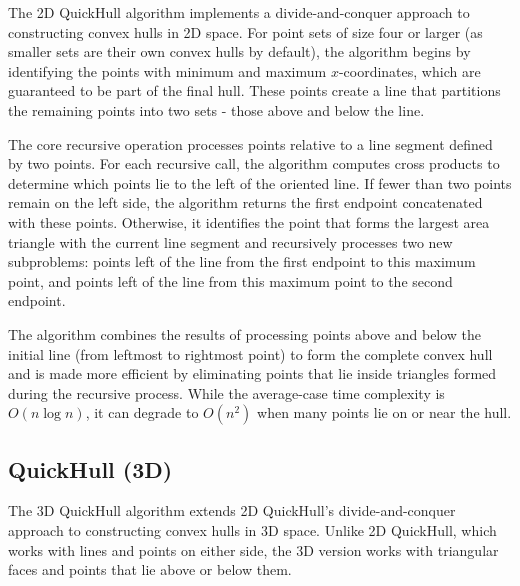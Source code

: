 \documentclass[12pt]{article}
\begin{document}
    \noindent
    The 2D QuickHull algorithm implements a divide-and-conquer approach to constructing convex hulls in 2D space. For point sets of size four or larger (as smaller sets are their own convex hulls by default), the algorithm begins by identifying the points with minimum and maximum $x$-coordinates, which are guaranteed to be part of the final hull. These points create a line that partitions the remaining points into two sets - those above and below the line.

    The core recursive operation processes points relative to a line segment defined by two points. For each recursive call, the algorithm computes cross products to determine which points lie to the left of the oriented line. If fewer than two points remain on the left side, the algorithm returns the first endpoint concatenated with these points. Otherwise, it identifies the point that forms the largest area triangle with the current line segment and recursively processes two new subproblems: points left of the line from the first endpoint to this maximum point, and points left of the line from this maximum point to the second endpoint.

    The algorithm combines the results of processing points above and below the initial line (from leftmost to rightmost point) to form the complete convex hull and is made more efficient by eliminating points that lie inside triangles formed during the recursive process. While the average-case time complexity is $O(n\log n)$, it can degrade to $O(n^2)$ when many points lie on or near the hull.

  \subsection*{QuickHull (3D)}

    The 3D QuickHull algorithm extends 2D QuickHull’s divide-and-conquer approach to constructing convex hulls in 3D space. Unlike 2D QuickHull, which works with lines and points on either side, the 3D version works with triangular faces and points that lie above or below them.
\end{document}
